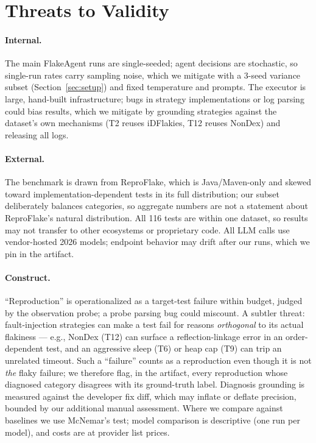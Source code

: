 \section{Threats to Validity}
\label{sec:threats}

\paragraph{Internal.} The main FlakeAgent runs are single-seeded; agent
decisions are stochastic, so single-run rates carry sampling noise, which we
mitigate with a 3-seed variance subset (Section~\ref{sec:setup}) and fixed
temperature and prompts. The executor is large, hand-built infrastructure;
bugs in strategy implementations or log parsing could bias results, which we
mitigate by grounding strategies against the dataset's own mechanisms (T2
reuses iDFlakies, T12 reuses NonDex) and releasing all logs.

\paragraph{External.} The benchmark is drawn from ReproFlake, which is
Java/Maven-only and skewed toward implementation-dependent tests in its full
distribution; our subset deliberately balances categories, so aggregate
numbers are not a statement about ReproFlake's natural distribution. All 116
tests are within one dataset, so results may not transfer to other ecosystems
or proprietary code. All LLM calls use vendor-hosted 2026 models; endpoint
behavior may drift after our runs, which we pin in the artifact.

\paragraph{Construct.} ``Reproduction'' is operationalized as a target-test
failure within budget, judged by the observation probe; a probe parsing bug
could miscount. A subtler threat: fault-injection strategies can make a test
fail for reasons \emph{orthogonal} to its actual flakiness — e.g., NonDex
(T12) can surface a reflection-linkage error in an order-dependent test, and
an aggressive sleep (T6) or heap cap (T9) can trip an unrelated timeout. Such
a ``failure'' counts as a reproduction even though it is not \emph{the} flaky
failure; we therefore flag, in the artifact, every reproduction whose
diagnosed category disagrees with its ground-truth label. Diagnosis grounding
is measured against the developer fix diff, which may inflate or deflate
precision, bounded by our additional manual assessment. Where we compare
against baselines we use McNemar's test; model comparison is descriptive
(one run per model), and costs are at provider list prices.
